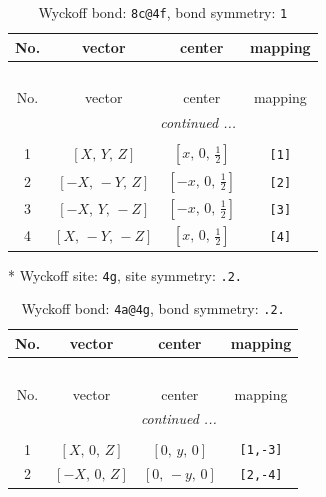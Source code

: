 \documentclass[fleqn,8pt]{jsarticle}
\begin{document}
\begin{longtable}{cccc}
\caption{Wyckoff bond: {\tt 8c@4f}, bond symmetry: {\tt 1}}
 \\
 \hline \hline
No. & vector & center & mapping \\ \hline \endfirsthead

\multicolumn{3}{l}{\tablename\ \thetable{}} \\
 \hline \hline
No. & vector & center & mapping \\ \hline \endhead

 \hline \hline
\multicolumn{3}{r}{\footnotesize\it continued ...} \\ \endfoot

 \hline \hline
\multicolumn{3}{r}{} \\ \endlastfoot

1 & $\left[ X,\, Y,\, Z \right]$ & $\left[ x,\, 0,\, \frac{1}{2} \right]$ & {\tt [1]} \\ \hline
2 & $\left[ - X,\, - Y,\, Z \right]$ & $\left[ - x,\, 0,\, \frac{1}{2} \right]$ & {\tt [2]} \\ \hline
3 & $\left[ - X,\, Y,\, - Z \right]$ & $\left[ - x,\, 0,\, \frac{1}{2} \right]$ & {\tt [3]} \\ \hline
4 & $\left[ X,\, - Y,\, - Z \right]$ & $\left[ x,\, 0,\, \frac{1}{2} \right]$ & {\tt [4]} \\
\end{longtable}
* Wyckoff site: {\tt 4g}, site symmetry: {\tt .2.}
\renewcommand{\arraystretch}{1.2}
\begin{longtable}{cccc}
\caption{Wyckoff bond: {\tt 4a@4g}, bond symmetry: {\tt .2.}}
 \\
 \hline \hline
No. & vector & center & mapping \\ \hline \endfirsthead

\multicolumn{3}{l}{\tablename\ \thetable{}} \\
 \hline \hline
No. & vector & center & mapping \\ \hline \endhead

 \hline \hline
\multicolumn{3}{r}{\footnotesize\it continued ...} \\ \endfoot

 \hline \hline
\multicolumn{3}{r}{} \\ \endlastfoot

1 & $\left[ X,\, 0,\, Z \right]$ & $\left[ 0,\, y,\, 0 \right]$ & {\tt [1,-3]} \\ \hline
2 & $\left[ - X,\, 0,\, Z \right]$ & $\left[ 0,\, - y,\, 0 \right]$ & {\tt [2,-4]} \\
\end{longtable}
\end{document}
